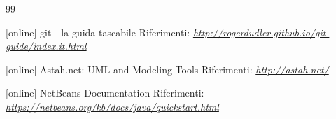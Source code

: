 \documentclass[t]{beamer} %
\begin{document}
\begin {frame} [allowframebreaks]
\begin {thebibliography}{99}
{     [online]
      git - la guida tascabile 
     \newblock Riferimenti: \emph{\url{http://rogerdudler.github.io/git-guide/index.it.html }}

     [online]
      Astah.net: UML and Modeling Tools
     \newblock Riferimenti: \emph{\url{http://astah.net/ }}

     [online]
      NetBeans Documentation
     \newblock Riferimenti: \emph{\url{https://netbeans.org/kb/docs/java/quickstart.html }}

   }
   \end {thebibliography}
\end {frame}
\end{document}
